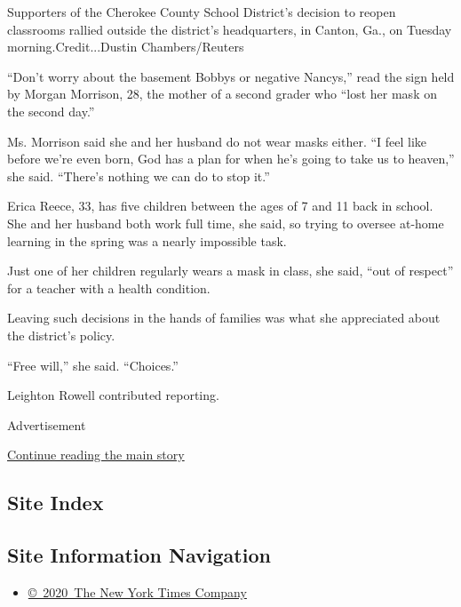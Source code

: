 Supporters of the Cherokee County School District's decision to reopen
classrooms rallied outside the district's headquarters, in Canton, Ga.,
on Tuesday morning.Credit...Dustin Chambers/Reuters

``Don't worry about the basement Bobbys or negative Nancys,'' read the
sign held by Morgan Morrison, 28, the mother of a second grader who
``lost her mask on the second day.''

Ms. Morrison said she and her husband do not wear masks either. ``I feel
like before we're even born, God has a plan for when he's going to take
us to heaven,'' she said. ``There's nothing we can do to stop it.''

Erica Reece, 33, has five children between the ages of 7 and 11 back in
school. She and her husband both work full time, she said, so trying to
oversee at-home learning in the spring was a nearly impossible task.

Just one of her children regularly wears a mask in class, she said,
``out of respect'' for a teacher with a health condition.

Leaving such decisions in the hands of families was what she appreciated
about the district's policy.

``Free will,'' she said. ``Choices.''

Leighton Rowell contributed reporting.

Advertisement

\protect\hyperlink{after-bottom}{Continue reading the main story}

\hypertarget{site-index}{%
\subsection{Site Index}\label{site-index}}

\hypertarget{site-information-navigation}{%
\subsection{Site Information
Navigation}\label{site-information-navigation}}

\begin{itemize}
\tightlist
\item
  \href{https://help.nytimes3xbfgragh.onion/hc/en-us/articles/115014792127-Copyright-notice}{©~2020~The
  New York Times Company}
\end{itemize}

